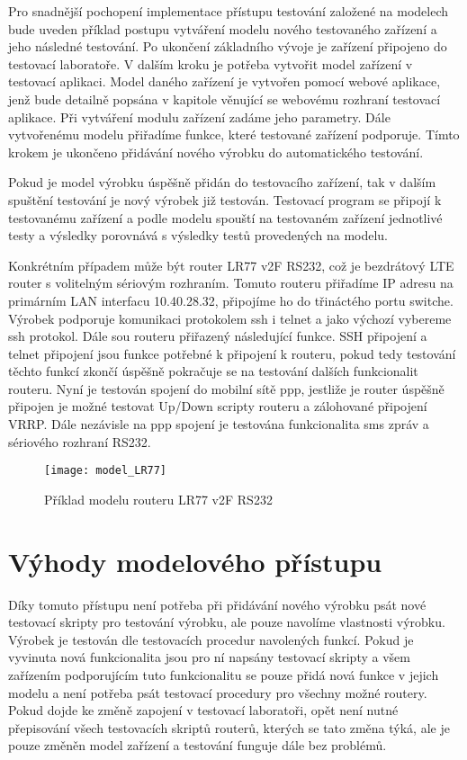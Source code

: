 Pro snadnější pochopení implementace přístupu testování založené na modelech bude uveden příklad postupu vytváření modelu nového testovaného zařízení a jeho následné testování. Po ukončení základního vývoje je zařízení připojeno do testovací laboratoře. V dalším kroku je potřeba vytvořit model zařízení v testovací aplikaci. Model daného zařízení je vytvořen pomocí webové aplikace, jenž bude detailně popsána v kapitole věnující se webovému rozhraní testovací aplikace. Při vytváření modulu zařízení zadáme jeho parametry. Dále vytvořenému modelu přiřadíme funkce, které testované zařízení podporuje. Tímto krokem je ukončeno přidávání nového výrobku do automatického testování.

Pokud je model výrobku úspěšně přidán do testovacího zařízení, tak v dalším spuštění testování je nový výrobek již testován. Testovací program se připojí k testovanému zařízení a podle modelu spouští na testovaném zařízení jednotlivé testy a výsledky porovnává s výsledky testů provedených na modelu.

Konkrétním případem může být router LR77 v2F RS232, což je bezdrátový LTE router s volitelným sériovým rozhraním. Tomuto routeru přiřadíme IP adresu na primárním LAN interfacu 10.40.28.32, připojíme ho do třináctého portu switche. Výrobek podporuje komunikaci protokolem ssh i telnet a jako výchozí vybereme ssh protokol. Dále sou  routeru přiřazený následující funkce. SSH připojení a telnet připojení jsou funkce potřebné k připojení k routeru, pokud tedy testování těchto funkcí zkončí úspěšně pokračuje se na testování dalších funkcionalit routeru. Nyní je testován spojení do mobilní sítě ppp, jestliže je router úspěšně připojen je možné testovat Up/Down scripty routeru a zálohované připojení VRRP. Dále nezávisle na ppp spojení je testována funkcionalita sms zpráv a sériového rozhraní RS232.

\begin{figure}[h]
  \centering
  \texttt{[image: model\_LR77]}
  \caption{Příklad modelu routeru LR77 v2F RS232}
  \label{fig:model_LR77}
\end{figure}

\section{Výhody modelového přístupu}

Díky tomuto přístupu není potřeba při přidávání nového výrobku psát nové testovací skripty pro testování výrobku, ale pouze navolíme vlastnosti výrobku. Výrobek je testován dle testovacích procedur navolených funkcí. Pokud je vyvinuta nová funkcionalita jsou pro ní napsány testovací skripty a všem zařízením podporujícím tuto funkcionalitu se pouze přidá nová funkce v jejich modelu a není potřeba psát testovací procedury pro všechny možné routery. Pokud dojde ke změně zapojení v testovací laboratoři, opět není nutné přepisování všech testovacích skriptů routerů, kterých se tato změna týká, ale je pouze změněn model zařízení a testování funguje dále bez problémů.

\endinput
